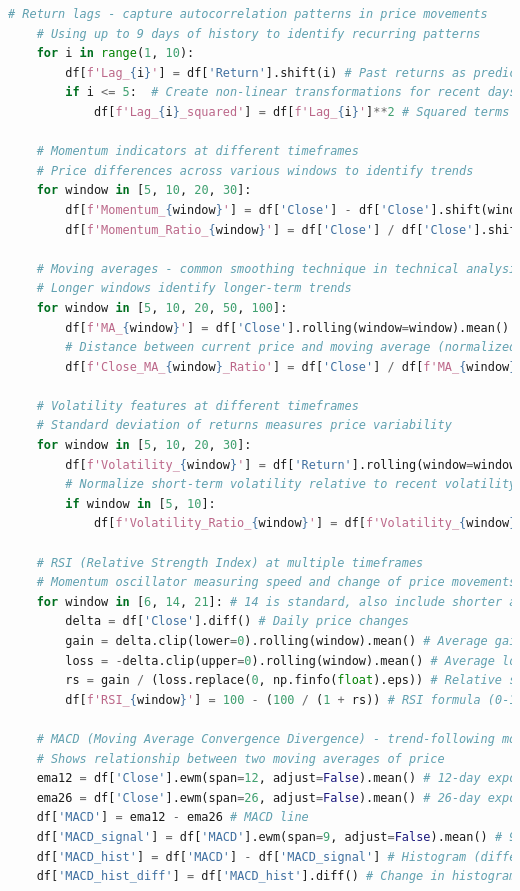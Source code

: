 \documentclass[12pt]{article}
\begin{document}
\begin{lstlisting}[language=Python]
    # Return lags - capture autocorrelation patterns in price movements
    # Using up to 9 days of history to identify recurring patterns
    for i in range(1, 10):
        df[f'Lag_{i}'] = df['Return'].shift(i) # Past returns as predictors
        if i <= 5:  # Create non-linear transformations for recent days
            df[f'Lag_{i}_squared'] = df[f'Lag_{i}']**2 # Squared terms capture magnitude effects
            
    # Momentum indicators at different timeframes
    # Price differences across various windows to identify trends
    for window in [5, 10, 20, 30]:
        df[f'Momentum_{window}'] = df['Close'] - df['Close'].shift(window) # Absolute change
        df[f'Momentum_Ratio_{window}'] = df['Close'] / df['Close'].shift(window) # Relative change
    
    # Moving averages - common smoothing technique in technical analysis
    # Longer windows identify longer-term trends
    for window in [5, 10, 20, 50, 100]:
        df[f'MA_{window}'] = df['Close'].rolling(window=window).mean() # Simple moving average
        # Distance between current price and moving average (normalized)
        df[f'Close_MA_{window}_Ratio'] = df['Close'] / df[f'MA_{window}'] # Relative position to trend
    
    # Volatility features at different timeframes
    # Standard deviation of returns measures price variability
    for window in [5, 10, 20, 30]:
        df[f'Volatility_{window}'] = df['Return'].rolling(window=window).std() # Historical volatility
        # Normalize short-term volatility relative to recent volatility trend
        if window in [5, 10]:
            df[f'Volatility_Ratio_{window}'] = df[f'Volatility_{window}'] / df[f'Volatility_{window}'].rolling(window=5).mean()
    
    # RSI (Relative Strength Index) at multiple timeframes
    # Momentum oscillator measuring speed and change of price movements
    for window in [6, 14, 21]: # 14 is standard, also include shorter and longer periods
        delta = df['Close'].diff() # Daily price changes
        gain = delta.clip(lower=0).rolling(window).mean() # Average gains over period
        loss = -delta.clip(upper=0).rolling(window).mean() # Average losses over period
        rs = gain / (loss.replace(0, np.finfo(float).eps)) # Relative strength ratio
        df[f'RSI_{window}'] = 100 - (100 / (1 + rs)) # RSI formula (0-100 scale)
    
    # MACD (Moving Average Convergence Divergence) - trend-following momentum indicator
    # Shows relationship between two moving averages of price
    ema12 = df['Close'].ewm(span=12, adjust=False).mean() # 12-day exponential moving average
    ema26 = df['Close'].ewm(span=26, adjust=False).mean() # 26-day exponential moving average
    df['MACD'] = ema12 - ema26 # MACD line
    df['MACD_signal'] = df['MACD'].ewm(span=9, adjust=False).mean() # 9-day EMA of MACD
    df['MACD_hist'] = df['MACD'] - df['MACD_signal'] # Histogram (difference between MACD and signal line)
    df['MACD_hist_diff'] = df['MACD_hist'].diff() # Change in histogram (acceleration/deceleration)
    

\end{lstlisting}
\end{document}
